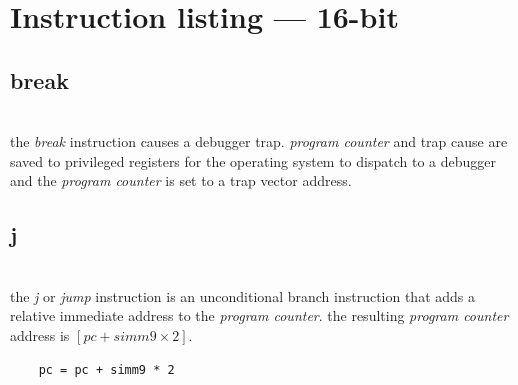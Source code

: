 \newcommand{\insrcimmsix}[4]{
\begin{tikzpicture}[scale=0.5]
\begin{scope}[every node/.style={font=\small, inner sep=0pt, right}]
\insncell{0}{3}{15}{13}{rc}{#1}
\insncell{3}{9}{12}{7}{imm}{#2}
\insnopsize{#3}{#4}
\end{scope}
\end{tikzpicture}
}

\newcommand{\insrcrbimmthree}[5]{
\begin{tikzpicture}[scale=0.5]
\begin{scope}[every node/.style={font=\small, inner sep=0pt, right}]
\insncell{0}{3}{15}{13}{rc}{#1}
\insncell{3}{6}{12}{10}{rb}{#2}
\insncell{6}{9}{9}{7}{imm}{#3}
\insnopsize{#4}{#5}
\end{scope}
\end{tikzpicture}
}

\newcommand{\insrcrbrc}[5]{
\begin{tikzpicture}[scale=0.5]
\begin{scope}[every node/.style={font=\small, inner sep=0pt, right}]
\insncell{0}{3}{15}{13}{rc}{#1}
\insncell{3}{6}{12}{10}{rb}{#2}
\insncell{6}{9}{9}{7}{ra}{#3}
\insnopsize{#4}{#5}
\end{scope}
\end{tikzpicture}
}

\section{Instruction listing --- 16-bit}

\subsection{break}
\\
the \emph{break} instruction causes a debugger trap.
\emph{program counter} and trap cause are saved to privileged
registers for the operating system to dispatch to a debugger
and the \emph{program counter} is set to a trap vector address.

\subsection{j}
\\
the \emph{j} or \emph{jump} instruction is an unconditional branch instruction
that adds a relative immediate address to the \emph{program counter}. the
resulting \emph{program counter} address is \emph{$[pc + simm9 \times 2]$}.
\begin{Verbatim}
    pc = pc + simm9 * 2
\end{Verbatim}

